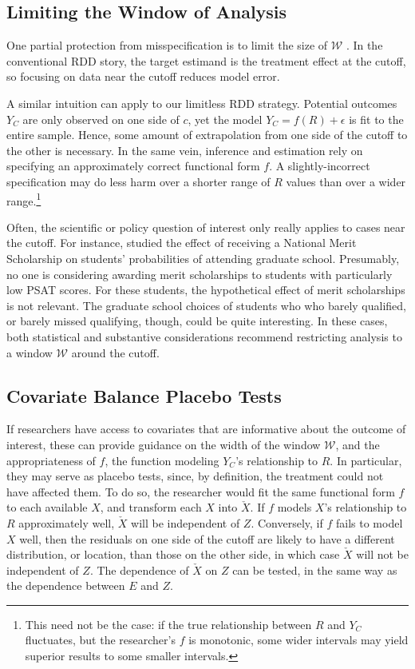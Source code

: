 \documentclass[12pt]{article}
\newcommand{\xch}{\check{X}}
\newcommand{\ych}{E}
\begin{document}
\subsection{Limiting the Window of Analysis}
One partial protection from misspecification is to limit the size of
$\mathcal{W}$ \citep[e.g.][]{imbens2008regression,angrist2009mostly}.
In the conventional RDD story, the target estimand is the treatment
effect at the cutoff, so focusing on data near the cutoff reduces
model error.

A similar intuition can apply to our limitless RDD strategy.
Potential outcomes $Y_C$ are only observed on one side of $c$, yet the
model $Y_C=f(R)+\epsilon$ is fit to the entire sample.
Hence, some amount of extrapolation from one side of the cutoff to the
other is necessary.
In the same vein, inference and estimation rely on specifying an
approximately correct functional form $f$.
A slightly-incorrect specification may do less harm over a shorter
range of $R$ values than over a wider range.\footnote{This need not be
  the case: if the true relationship between $R$ and $Y_C$ fluctuates,
  but the researcher's $f$ is monotonic, some wider intervals may
  yield superior results to some smaller intervals.}

Often, the scientific or policy question of interest only really
applies to cases near the cutoff.
For instance, \citet{thistlethwaite1960regression} studied the effect
of receiving a National Merit Scholarship on students' probabilities
of attending graduate school.
Presumably, no one is considering awarding merit scholarships to students with particularly
low PSAT scores.
For these students, the hypothetical effect of merit scholarships is
not relevant.
The graduate school choices of students who who barely qualified, or
barely missed qualifying, though, could be quite interesting.
In these cases, both statistical and substantive considerations
recommend restricting analysis to a window $\mathcal{W}$ around the
cutoff.

\subsection{Covariate Balance Placebo Tests}
If researchers have access to covariates that are informative about
the outcome of interest, these can provide guidance on the width of the window
$\mathcal{W}$, and the appropriateness of $f$, the function modeling
$Y_C$'s relationship to $R$.
In particular, they may serve as placebo tests, since, by definition,
the treatment could not have affected them.
To do so, the researcher would fit the same functional form $f$ to
each available $X$, and transform each $X$ into $\xch$.
If $f$ models $X$'s relationship to $R$ approximately well,
$\xch$ will be independent of $Z$.
Conversely, if $f$ fails to model $X$ well, then the residuals on one
side of the cutoff are likely to have a different distribution, or
location, than those on the other side, in which case $\xch$ will not
be independent of $Z$.
The dependence of $\xch$ on $Z$ can be tested, in the same way as the
dependence between $\ych$ and $Z$.
\end{document}
